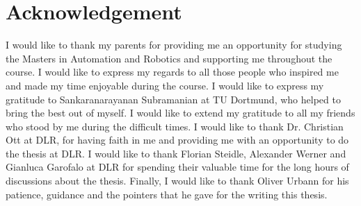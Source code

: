 \section*{Acknowledgement}
I would like to thank my parents for providing me an opportunity for studying the Masters in Automation and Robotics and supporting me throughout the course. I would like to express my regards to all those people who inspired me and made my time enjoyable during the course. I would like to express my gratitude to Sankaranarayanan Subramanian at TU Dortmund, who helped to bring the best out of myself. I would like to extend my gratitude to all my friends who stood by me during the difficult times. I would like to thank Dr. Christian Ott at DLR, for having faith in me and providing me with an opportunity to do the thesis at DLR. I would like to thank Florian Steidle, Alexander Werner and Gianluca Garofalo at DLR for spending their valuable time for the long hours of discussions about the thesis. Finally, I would like to thank Oliver Urbann for his patience, guidance and the pointers that he gave for the writing this thesis.